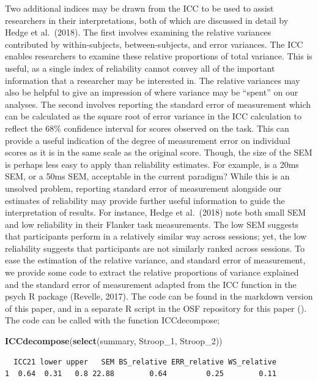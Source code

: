 \documentclass[english,,man,floatsintext]{apa6}
\newenvironment{Shaded}{\begin{snugshade}}{\end{snugshade}}
\newcommand{\DecValTok}[1]{\textcolor[rgb]{0.00,0.00,0.81}{#1}}
\newcommand{\KeywordTok}[1]{\textcolor[rgb]{0.13,0.29,0.53}{\textbf{#1}}}
\newcommand{\NormalTok}[1]{#1}
\begin{document}
Two additional indices may be drawn from the ICC to be used to assist researchers in their interpretations, both of which are discussed in detail by Hedge et al.~(2018). The first involves examining the relative variances contributed by within-subjects, between-subjects, and error variances. The ICC enables researchers to examine these relative proportions of total variance. This is useful, as a single index of reliability cannot convey all of the important information that a researcher may be interested in. The relative variances may also be helpful to give an impression of where variance may be \enquote{spent} on our analyses. The second involves reporting the standard error of measurement which can be calculated as the square root of error variance in the ICC calculation to reflect the 68\% confidence interval for scores observed on the task. This can provide a useful indication of the degree of measurement error on individual scores as it is in the same scale as the original score. Though, the size of the SEM is perhaps less easy to apply than reliability estimates. For example, is a 20ms SEM, or a 50ms SEM, acceptable in the current paradigm? While this is an unsolved problem, reporting standard error of measurement alongside our estimates of reliability may provide further useful information to guide the interpretation of results. For instance, Hedge et al.~(2018) note both small SEM and low reliability in their Flanker task measurements. The low SEM suggests that participants perform in a relatively similar way across sessions; yet, the low reliability suggests that participants are not similarly ranked across sessions. To ease the estimation of the relative variance, and standard error of measurement, we provide some code to extract the relative proportions of variance explained and the standard error of measurement adapted from the ICC function in the psych R package (Revelle, 2017). The code can be found in the markdown version of this paper, and in a separate R script in the OSF repository for this paper (). The code can be called with the function ICCdecompose;

\begin{Shaded}
\begin{Highlighting}[]
\KeywordTok{ICCdecompose}\NormalTok{(}\KeywordTok{select}\NormalTok{(summary, Stroop_}\DecValTok{1}\NormalTok{, Stroop_}\DecValTok{2}\NormalTok{))}
\end{Highlighting}
\end{Shaded}

\begin{verbatim}
  ICC21 lower upper   SEM BS_relative ERR_relative WS_relative
1  0.64  0.31   0.8 22.88        0.64         0.25        0.11
\end{verbatim}
\end{document}
